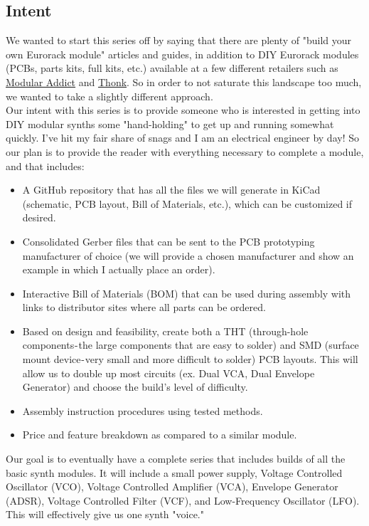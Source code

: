 \documentclass{article}
\begin{document}
\subsection{Intent}
We wanted to start this series off by saying that there are plenty of "build your own Eurorack module" articles and guides, in addition to DIY Eurorack modules (PCBs, parts kits, full kits, etc.) available at a few different retailers such as \href{https://modularaddict.com}{Modular Addict} and \href{https://www.thonk.co.uk}{Thonk}. So in order to not saturate this landscape too much, we wanted to take a slightly different approach. \\
\newline
Our intent with this series is to provide someone who is interested in getting into DIY modular synths some "hand-holding" to get up and running somewhat quickly. I've hit my fair share of snags and I am an electrical engineer by day! So our plan is to provide the reader with everything necessary to complete a module, and that includes:
\begin{itemize}
	\item A GitHub repository that has all the files we will generate in KiCad (schematic, PCB layout, Bill of Materials, etc.), which can be customized if desired.
	\item Consolidated Gerber files that can be sent to the PCB prototyping manufacturer of choice (we will provide a chosen manufacturer and show an example in which I actually place an order).
	\item Interactive Bill of Materials (BOM) that can be used during assembly with links to distributor sites where all parts can be ordered.
	\item Based on design and feasibility, create both a THT (through-hole components - the large components that are easy to solder) and SMD (surface mount device - very small and more difficult to solder) PCB layouts. This will allow us to double up most circuits (ex. Dual VCA, Dual Envelope Generator) and choose the build's level of difficulty.
	\item Assembly instruction procedures using tested methods.
	\item Price and feature breakdown as compared to a similar module.
\end{itemize}
Our goal is to eventually have a complete series that includes builds of all the basic synth modules. It will include a small power supply, Voltage Controlled Oscillator (VCO), Voltage Controlled Amplifier (VCA), Envelope Generator (ADSR), Voltage Controlled Filter (VCF), and Low-Frequency Oscillator (LFO). This will effectively give us one synth "voice." \\
\end{document}
